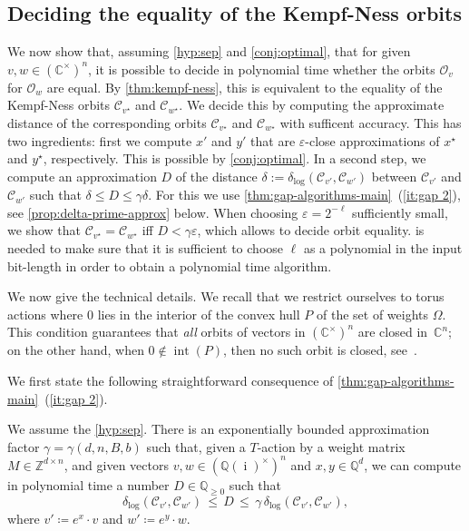 \documentclass[a4paper,USenglish,cleveref,numberwithinsect]{lipics-v2021}
\DeclareMathOperator{\ii}{i}
\newcommand{\distLD}{\delta_{\log}}
\DeclareMathOperator{\inter}{int}
\newcommand{\QQ}{\mathbb{Q}}
\newcommand{\CC}{\mathbb{C}}
\newcommand{\ZZ}{\mathbb{Z}}
\newcommand{\OO}{\ensuremath{\mathcal{O}}}
\newcommand{\KK}{\ensuremath{\mathcal{C}}}
\numberwithin{equation}{section}
\begin{document}
\subsection{Deciding the equality of the Kempf-Ness orbits}\label{sec:kn-approach-in-poly-time}
We now show that, assuming \cref{hyp:sep} and \cref{conj:optimal}, that for given $v,w\in (\CC^\times)^n$,
it is possible to decide in polynomial time whether the orbits $\OO_v$ for $\OO_w$ are equal.
By \cref{thm:kempf-ness}, this is equivalent to the equality of the Kempf-Ness orbits
$\KK_{v^\star}$ and $\KK_{w^\star}$. We decide this
by computing the approximate distance of the corresponding orbits
$\KK_{v^\star}$ and $\KK_{w^\star}$
with sufficent accuracy.
This has two ingredients: first we compute $x'$ and $y'$ that are $\varepsilon$-close approximations of $x^\star$ and $y^\star$, respectively.
This is possible by  \cref{conj:optimal}.
In a second step, we compute an approximation $D$ of the distance
$\delta:=\distLD (\KK_{v'} , \KK_{w'})$ between $\KK_{v'}$ and $\KK_{w'}$
such that $\delta \leq D \leq \gamma \delta$.
For this we use \cref{thm:gap-algorithms-main}~(\ref{it:gap 2}),
see \cref{prop:delta-prime-approx} below.
When choosing $\varepsilon=2^{-\ell}$ sufficiently small, we show that
$\KK_{v^\star} = \KK_{w^\star}$ iff $D < \gamma\varepsilon$,
which allows to decide orbit equality.
 is needed to make sure that it is sufficient to
choose $\ell$ as a polynomial in the input bit-length
in order to obtain a polynomial time algorithm.

We now give the technical details.
We recall that we restrict ourselves to torus actions where $0$ lies in the interior of the convex hull $P$ of the set of weights $\Omega$.
This condition guarantees that {\em all} orbits of vectors in $(\CC^\times)^n$ are closed in~$\CC^n$;
on the other hand, when $0\not\in\inter(P)$, then no such orbit is closed, see~\cite{torus}.


We first state the following straightforward consequence of \cref{thm:gap-algorithms-main}~(\ref{it:gap 2}).

\begin{corollary}\label{prop:delta-prime-approx}
We assume the \cref{hyp:sep}. %
There is an exponentially bounded approximation factor $\gamma=\gamma(d,n,B,b)$
such that,
given a $T$-action by a weight matrix $M\in\ZZ^{d\times n}$, and
given vectors  $v,w\in(\QQ(\ii)^\times)^n$ and $x,y\in\QQ^d$,
we can compute in polynomial time a number $D\in\QQ_{\geq 0}$ such that
\[
    \distLD ( \KK_{v'}, \KK_{w'} )\, \leq\, D \,\leq\, \gamma\, \distLD (\KK_{v'} , \KK_{w'}) ,
\]
where $v'\coloneqq e^x\cdot v$ and $w'\coloneqq e^y\cdot w$.
\end{corollary}
\end{document}
